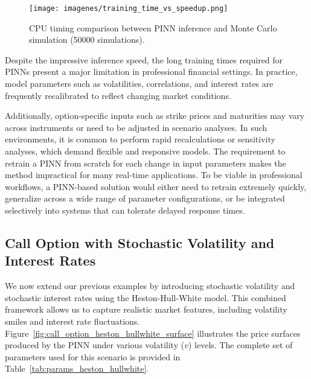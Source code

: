 \documentclass[12pt]{report} %
\theoremstyle{plain}           %
\theoremstyle{definition}      %
\theoremstyle{remark}          %
\begin{document}
\begin{figure}[H]
    \centering
    \texttt{[image: imagenes/training\_time\_vs\_speedup.png]}
    \caption{CPU timing comparison between PINN inference and Monte Carlo simulation (50000 simulations).}
    \label{fig:speedup}
\end{figure}

Despite the impressive inference speed, the long training times required for PINNs present a 
major limitation in professional financial settings. In practice, model parameters such 
as volatilities, correlations, and interest rates are frequently recalibrated to reflect changing market conditions. 

Additionally, option-specific inputs such as strike prices and maturities may vary across instruments 
or need to be adjusted in scenario analyses. In such environments, it is common to perform rapid 
recalculations or sensitivity analyses, which demand flexible and responsive models. The requirement to 
retrain a PINN from scratch for each change in input parameters makes the method impractical for 
many real-time applications. To be viable in professional workflows, a PINN-based solution 
would either need to retrain extremely quickly, generalize across a wide range of 
parameter configurations, or be integrated selectively into systems that can tolerate delayed response times.

\subsection{Call Option with Stochastic Volatility and Interest Rates}

We now extend our previous examples by introducing stochastic volatility 
and stochastic interest rates using the Heston-Hull-White model. This 
combined framework allows us to capture realistic market features, including 
volatility smiles and interest rate fluctuations. 
Figure~\ref{fig:call_option_heston_hullwhite_surface} illustrates the price surfaces 
produced by the PINN under various volatility ($v$) levels. The complete set 
of parameters used for this scenario is provided in Table~\ref{tab:params_heston_hullwhite}.
\end{document}
